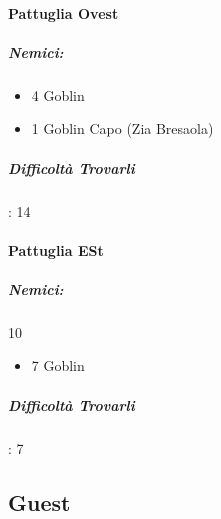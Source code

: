 \documentclass{article}
\begin{document}
           \paragraph{Pattuglia Ovest}
                    \subparagraph{Nemici:}
                    \begin{itemize}
                        \item 4 Goblin
                        \item 1 Goblin Capo (Zia Bresaola)
                        
                    \end{itemize}
                    \subparagraph{Difficoltà Trovarli}: 14
            \paragraph{Pattuglia ESt}
                    \subparagraph{Nemici:}10
                    \begin{itemize}
                        \item 7 Goblin
                    \end{itemize}
                    \subparagraph{Difficoltà Trovarli}: 7

\subsection{Guest}
\end{document}
